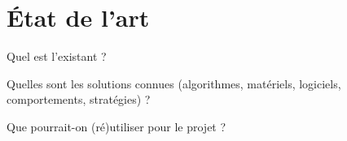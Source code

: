 \chapter{État de l'art}

Quel est l’existant ? 

Quelles sont les solutions connues (algorithmes, matériels, logiciels, comportements, stratégies) ? 

Que pourrait-on (ré)utiliser pour le projet ? 